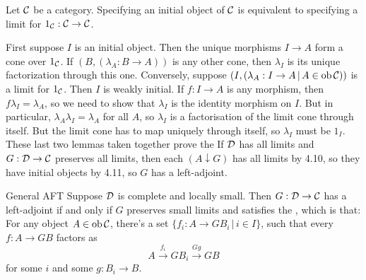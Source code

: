 \documentclass{article}
\begin{document}
\begin{fancylem}{}
    Let $\mathcal{C}$ be a category. Specifying an initial object of $\mathcal{C}$ is equivalent to specifying a limit for $1_{\mathcal{C}} : \mathcal{C} \to \mathcal{C}$.
\end{fancylem}
\proof First suppose $I$ is an initial object. Then the unique morphisms $I \to A$ form a cone over $1_{\mathcal{C}}$. If $(B, (\lambda_{A} : B \to A))$ is any other cone, then $\lambda_{I}$ is its unique factorization through this one. \gap Conversely, suppose $(I, (\lambda_{A} : I \to A \, | \, A \in \operatorname{ob} \mathcal{C}))$ is a limit for $1_{\mathcal{C}}$. Then $I$ is weakly initial. If $f : I \to A$ is any morphism, then $f \lambda_{I}=\lambda_{A}$, so we need to show that $\lambda_{I}$ is the identity morphism on $I$. But in particular, $\lambda_{A} \lambda_{I}=\lambda_{A}$ for all $A$, so $\lambda_{I}$ is a factorisation of the limit cone through itself. But the limit cone has to map uniquely through itself, so $\lambda_{I}$ must be $1_{I}$. \endproof
These last two lemmas taken together prove the  If $\mathcal{D}$ has all limits and $G : \mathcal{D} \to \mathcal{C}$ preserves all limits, then each $(A \downarrow G)$ has all limits by 4.10, so they have initial objects by 4.11, so $G$ has a left-adjoint.
\begin{fancythm}{General AFT} \newlec Suppose $\mathcal{D}$ is complete and locally small. Then $G: \mathcal{D} \to \mathcal{C}$ has a left-adjoint if and only if $G$ preserves small limits and satisfies the , which is that:
    For any object $A \in \operatorname{ob} \mathcal{C}$, there's a set $\{ f_{i} : A \to GB_{i} \, | \, i \in I\}$, such that every $f: A \to GB$ factors as \[ A \xrightarrow{f_{i}} GB_{i} \xrightarrow{Gg} GB\] for some $i$ and some $g : B_{i} \to B$.
\end{fancythm}
\proof \hspace{0.1cm}
\end{document}
